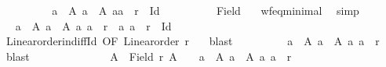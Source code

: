 \begin{isabellebody}
\ \ \ \ \ \ \isamarkupfalse%
\ \isamarkupfalse%
\ {\isachardoublequoteopen}{\isasymexists}a\ {\isasymin}\ A{\isachardot}{\kern0pt}\ {\isasymforall}a{\isacharprime}{\kern0pt}\ {\isasymin}\ A{\isachardot}{\kern0pt}\ {\isacharparenleft}{\kern0pt}a{\isacharprime}{\kern0pt}{\isacharcomma}{\kern0pt}a{\isacharparenright}{\kern0pt}\ {\isasymnotin}\ r\ {\isacharminus}{\kern0pt}\ Id{\isachardoublequoteclose}\isanewline
\ \ \ \ \ \ \ \ \isamarkupfalse%
\ Field\ {\isacharasterisk}{\kern0pt}\ \isamarkupfalse%
\ wf{\isacharunderscore}{\kern0pt}eq{\isacharunderscore}{\kern0pt}minimal{}\ \isamarkupfalse%
\ simp\isanewline
\ \ \ \ \ \ \isamarkupfalse%
\ \isamarkupfalse%
\ {\isachardoublequoteopen}{\isasymforall}a\ {\isasymin}\ A{\isachardot}{\kern0pt}\ {\isasymforall}a{\isacharprime}{\kern0pt}\ {\isasymin}\ A{\isachardot}{\kern0pt}\ {\isacharparenleft}{\kern0pt}a{\isacharcomma}{\kern0pt}\ a{\isacharprime}{\kern0pt}{\isacharparenright}{\kern0pt}\ {\isasymin}\ r\ {\isasymlongleftrightarrow}\ {\isacharparenleft}{\kern0pt}a{\isacharprime}{\kern0pt}{\isacharcomma}{\kern0pt}\ a{\isacharparenright}{\kern0pt}\ {\isasymnotin}\ r\ {\isacharminus}{\kern0pt}\ Id{\isachardoublequoteclose}\isanewline
\ \ \ \ \ \ \ \ \isamarkupfalse%
\ Linear{\isacharunderscore}{\kern0pt}order{\isacharunderscore}{\kern0pt}in{\isacharunderscore}{\kern0pt}diff{\isacharunderscore}{\kern0pt}Id\ {\isacharbrackleft}{\kern0pt}OF\ {\isacartoucheopen}Linear{\isacharunderscore}{\kern0pt}order\ r{\isacartoucheclose}{\isacharbrackright}{\kern0pt}\ {\isacharasterisk}{\kern0pt}{\isacharasterisk}{\kern0pt}\ \isamarkupfalse%
\ blast\isanewline
\ \ \ \ \ \ \isamarkupfalse%
\ \isamarkupfalse%
\ {\isachardoublequoteopen}{\isasymexists}a\ {\isasymin}\ A{\isachardot}{\kern0pt}\ {\isasymforall}a{\isacharprime}{\kern0pt}\ {\isasymin}\ A{\isachardot}{\kern0pt}\ {\isacharparenleft}{\kern0pt}a{\isacharcomma}{\kern0pt}\ a{\isacharprime}{\kern0pt}{\isacharparenright}{\kern0pt}\ {\isasymin}\ r{\isachardoublequoteclose}\ \isamarkupfalse%
\ blast\isanewline
\ \ \ \ \isamarkupfalse%
\isanewline
\ \ \isamarkupfalse%
\isanewline
\ \ \ \ \isamarkupfalse%
\ {\isacharasterisk}{\kern0pt}{\isacharcolon}{\kern0pt}\ {\isachardoublequoteopen}{\isasymforall}A\ {\isasymsubseteq}\ Field\ r{\isachardot}{\kern0pt}\ A\ {\isasymnoteq}\ {\isacharbraceleft}{\kern0pt}{\isacharbraceright}{\kern0pt}\ {\isasymlongrightarrow}\ {\isacharparenleft}{\kern0pt}{\isasymexists}a\ {\isasymin}\ A{\isachardot}{\kern0pt}\ {\isasymforall}a{\isacharprime}{\kern0pt}\ {\isasymin}\ A{\isachardot}{\kern0pt}\ {\isacharparenleft}{\kern0pt}a{\isacharcomma}{\kern0pt}\ a{\isacharprime}{\kern0pt}{\isacharparenright}{\kern0pt}\ {\isasymin}\ r{\isacharparenright}{\kern0pt}{\isachardoublequoteclose}\isanewline

\end{isabellebody}
